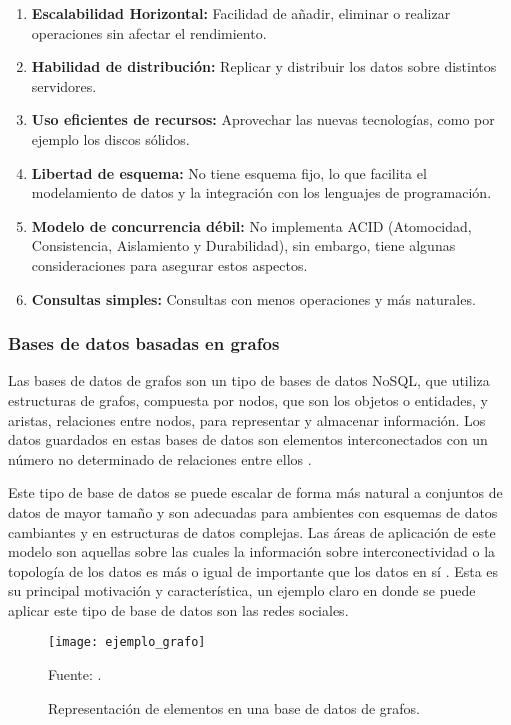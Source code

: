 \begin{enumerate}
  \item \textbf{Escalabilidad Horizontal:} Facilidad de añadir, eliminar o realizar operaciones sin afectar el rendimiento.
  \item \textbf{Habilidad de distribución:} Replicar y distribuir los datos sobre distintos servidores.
  \item \textbf{Uso eficientes de recursos:} Aprovechar las nuevas tecnologías, como por ejemplo los discos sólidos.
  \item \textbf{Libertad de esquema:} No tiene esquema fijo, lo que facilita el modelamiento de datos y la integración con los lenguajes de programación.
  \item \textbf{Modelo de concurrencia débil:} No implementa ACID (Atomocidad, Consistencia, Aislamiento y Durabilidad), sin embargo, tiene algunas consideraciones para asegurar estos aspectos.
  \item \textbf{Consultas simples:} Consultas con menos operaciones y más naturales.
\end{enumerate}

\subsubsection{Bases de datos basadas en grafos}
Las bases de datos de grafos son un tipo de bases de datos NoSQL, que utiliza estructuras de grafos, compuesta por nodos, que son los objetos o entidades, y aristas, relaciones entre nodos, para representar y almacenar información. Los datos guardados en estas bases de datos son elementos interconectados con un número no determinado de relaciones entre ellos \cite{romero2012utilidad}.

Este tipo de base de datos se puede escalar de forma más natural a conjuntos de datos de mayor tamaño y son adecuadas para ambientes con esquemas de datos cambiantes y en estructuras de datos complejas. Las áreas de aplicación de este modelo son aquellas sobre las cuales la información sobre interconectividad o la topología de los datos es más o igual de importante que los datos en sí \cite{angles2008survey}. Esta es su principal motivación y característica, un ejemplo claro en donde se puede aplicar este tipo de base de datos son las redes sociales.

\begin{figure}[h]
\centering
\texttt{[image: ejemplo\_grafo]}
\caption{\label{fig:ejemplo_grafo} Representación de elementos en una base de datos de grafos.} Fuente: \cite{del2013bases}.
\end{figure}

